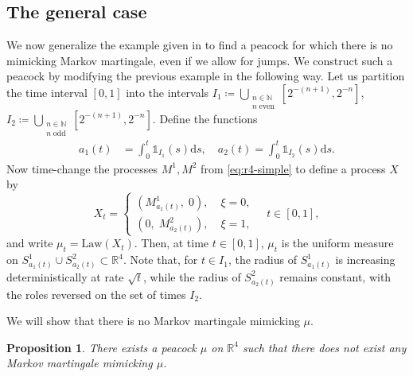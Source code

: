 \documentclass[12pt,oneside]{amsart}
\newtheorem{proposition}[theorem]{Proposition}
\theoremstyle{definition}
\newcommand{\Law}{\mathrm{Law}}
\newcommand{\D}{\mathrm{d}}
\newcommand{\N}{\mathbb N}
\newcommand{\R}{\mathbb R}
\def\R{{\mathbb R}}
\numberwithin{equation}{section}
\begin{document}
\subsection{The general case}
We now generalize the example given in  to find a peacock for which there is no mimicking Markov martingale, even if we allow for jumps. We construct such a peacock by modifying the previous example in the following way. Let us partition the time interval $[0, 1]$ into the intervals $I_1 \coloneqq \bigcup_{\substack{n \in \N\\n\;\text{even}}} [2^{-(n+1)}, 2^{-n}]$, $I_2 \coloneqq \bigcup_{\substack{n \in \N\\n\;\text{odd}}} [2^{-(n+1)}, 2^{-n}]$. Define the functions
	\begin{equation}
		\begin{split}
			a_1(t) & = \int_0^t \mathds{1}_{I_1}(s) \D s, \quad a_2(t) = \int_0^t \mathds{1}_{I_2}(s) \D s.
		\end{split}
	\end{equation}
	Now time-change the processes $M^1, M^2$ from \eqref{eq:r4-simple} to define a process $X$ by
	\begin{equation}\label{eq:r4-dyadic}
		X_t = \begin{cases}
			\!\left(M^1_{a_1(t)}, \; 0\right)\!, \; & \xi = 0,\\
			\!\left(0, \; M^2_{a_2(t)}\right)\!, & \xi = 1,
		\end{cases}\quad t \in [0, 1],
	\end{equation}
	and write $\mu_t = \Law(X_t)$. Then, at time $t \in [0, 1]$, $\mu_t$ is the uniform measure on $S^1_{a_1(t)} \cup S^2_{a_2(t)} \subset \R^4$. Note that, for $t \in I_1$, the radius of $S^1_{a_1(t)}$ is increasing deterministically at rate $\sqrt{t}$, while the radius of $S^2_{a_2(t)}$ remains constant, with the roles reversed on the set of times $I_2$.
	
	We will show that there is no Markov martingale mimicking $\mu$.

\begin{proposition}\label{prop:ex-discontinuous}
	There exists a peacock $\mu$ on $\R^4$ such that there does not exist any \emph{Markov martingale} mimicking $\mu$.
\end{proposition}
\end{document}
